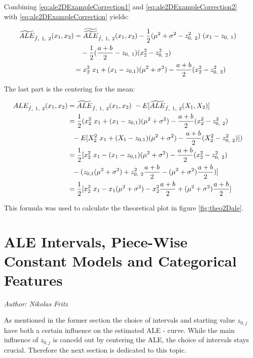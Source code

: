 \documentclass[
]{krantz}
\begin{document}
Combining \eqref{eq:ale2DExampleCorrection1} and \eqref{eq:ale2DExampleCorrection2} with \eqref{eq:ale2DExampleCorrection} yields:

\begin{align} 
\widetilde{ALE}_{\hat{f},~1,~2}(x_1, x_2) 
&= \widetilde{\widetilde{ALE}}_{\hat{f},~1,~2}(x_1, x_2) - \frac{1}{2}(\mu^2 + \sigma^2 - z_{0,~2}^2)~(x_1 - z_{0,~1}) \notag \\
& ~~~ - \frac{1}{2}(\frac{a+b}{2} - z_{0, ~1})(x_2^2 - z_{0, ~2}^2) \notag \\
&= x_2^2~x_1 + (x_1 - z_{0,1})(\mu^2+\sigma^2) - \frac{a + b}{2}(x_2^2-z_{0,~2}^2)
\end{align}

The last part is the centering for the mean:

\begin{align} 
ALE_{\hat{f},~1,~2}(x_1, x_2) &= \widetilde{ALE}_{\hat{f},~1,~2}(x_1, x_2) ~ -  E[\widetilde{ALE}_{\hat{f},~1,~2}(X_1, X_2)] \notag \\
&= \frac{1}{2} (x_2^2~x_1 + (x_1 - z_{0,1})(\mu^2+\sigma^2) - \frac{a + b}{2}(x_2^2-z_{0,~2}^2) \notag \\
& ~~ - E[X_2^2~x_1 + (X_1 - z_{0,1})(\mu^2+\sigma^2) - \frac{a + b}{2}(X_2^2-z_{0,~2}^2)] ) \notag \\
&= \frac{1}{2} [x_2^2~x_1 - (x_1 - z_{0,1})(\mu^2+\sigma^2) - \frac{a + b}{2}(x_2^2-z_{0,~2}^2) \notag \\
& ~~ - (z_{0,1}(\mu^2+\sigma^2) + z_{0,~2}^2 \frac{a + b}{2} - (\mu^2+\sigma^2) \frac{a + b}{2}) ] \notag \\
&= \frac{1}{2} [x_2^2~x_1 - x_1(\mu^2+\sigma^2) - x_2^2 \frac{a + b}{2} + (\mu^2+\sigma^2) \frac{a + b}{2} ]
\end{align}

This formula was used to calculate the theoretical plot in figure \ref{fig:theo2Dale}.

\hypertarget{ale-intervals-piece-wise-constant-models-and-categorical-features}{%
\chapter{ALE Intervals, Piece-Wise Constant Models and Categorical Features}\label{ale-intervals-piece-wise-constant-models-and-categorical-features}}

\emph{Author: Nikolas Fritz}

As mentioned in the former section the choice of intervals and starting value \(z_{0,j}\) have both a certain influence on the estimated ALE - curve. While the main influence of \(z_{0,j}\) is canceld out by centering the ALE, the choice of intervals stays crucial. Therefore the next section is dedicated to this topic.
\end{document}
